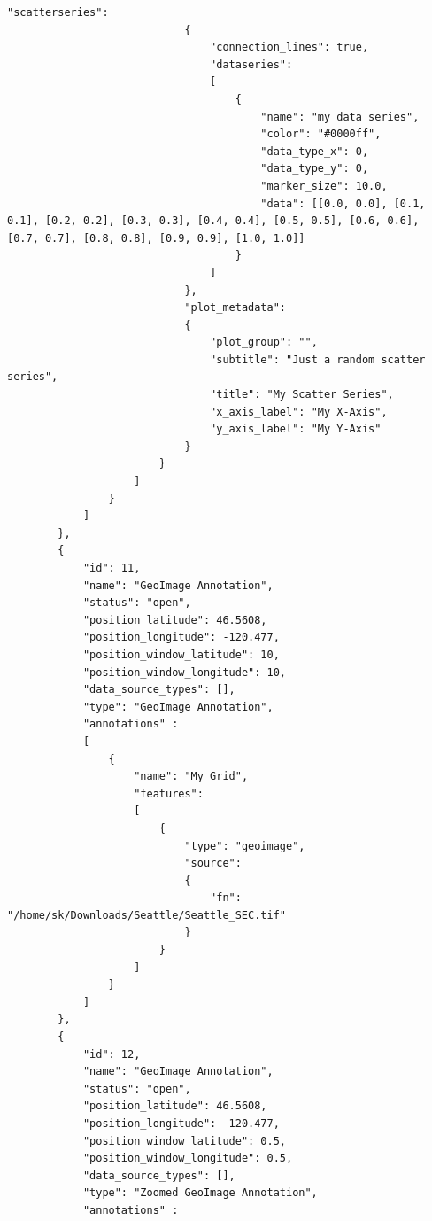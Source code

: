 \begin{lstlisting}[basicstyle=\small\ttfamily]
                            "scatterseries": 
                            {
                                "connection_lines": true,
                                "dataseries": 
                                [
                                    {
                                        "name": "my data series",
                                        "color": "#0000ff",
                                        "data_type_x": 0,
                                        "data_type_y": 0,
                                        "marker_size": 10.0,
                                        "data": [[0.0, 0.0], [0.1, 0.1], [0.2, 0.2], [0.3, 0.3], [0.4, 0.4], [0.5, 0.5], [0.6, 0.6], [0.7, 0.7], [0.8, 0.8], [0.9, 0.9], [1.0, 1.0]]
                                    }
                                ]
                            },
                            "plot_metadata":
                            {
                                "plot_group": "",
                                "subtitle": "Just a random scatter series",
                                "title": "My Scatter Series",
                                "x_axis_label": "My X-Axis",
                                "y_axis_label": "My Y-Axis"
                            }
                        }      
                    ]
                }
            ]
        },
        {
            "id": 11,
            "name": "GeoImage Annotation",
            "status": "open",
            "position_latitude": 46.5608,
            "position_longitude": -120.477,
            "position_window_latitude": 10,
            "position_window_longitude": 10,
            "data_source_types": [],
            "type": "GeoImage Annotation",
            "annotations" :
            [
                {
                    "name": "My Grid",
                    "features":
                    [
                        {
                            "type": "geoimage",
                            "source": 
                            {
                                "fn": "/home/sk/Downloads/Seattle/Seattle_SEC.tif"
                            }
                        }
                    ]
                }
            ]
        },
        {
            "id": 12,
            "name": "GeoImage Annotation",
            "status": "open",
            "position_latitude": 46.5608,
            "position_longitude": -120.477,
            "position_window_latitude": 0.5,
            "position_window_longitude": 0.5,
            "data_source_types": [],
            "type": "Zoomed GeoImage Annotation",
            "annotations" :

\end{lstlisting}
